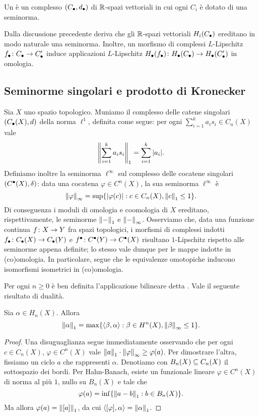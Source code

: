 \begin{definition}
Un  è un complesso $(C_\bullet,d_\bullet)$ di $\mathbb{R}$-spazi vettoriali in cui ogni $C_i$ è dotato di una seminorma.
\end{definition}

Dalla discussione precedente deriva che gli $\mathbb{R}$-spazi vettoriali $H_i(C_\bullet)$ ereditano in modo naturale una seminorma. Inoltre, un morfismo di complessi $L$-Lipschitz $\map{f_\bul}{C_\bul}{C'_\bul}$ induce applicazioni $L$-Lipschitz $\map{H_\bul(f_\bul)}{H_\bul(C_\bul)}{H_\bul(C'_\bul)}$ in omologia.

\subsection{Seminorme singolari e prodotto di Kronecker}

Sia $X$ uno spazio topologico. Muniamo il complesso delle catene singolari $(C_\bullet(X),d)$ della norma $\ell^1$, definita come segue: per ogni $\sum_{i=1}^ka_is_i\in C_n(X)$ vale
\[
\left\lVert \sum_{i=1}^ka_is_i\right\rVert_1=\sum_{i=1}^k|a_i|.
\]
Definiamo inoltre la seminorma $\ell^\infty$ sul complesso delle cocatene singolari $(C^\bullet(X),\delta)$: data una cocatena $\varphi\in C^n(X)$, la sua seminorma $\ell^\infty$ è
\[
\left\lVert \varphi\right\rVert_\infty=\sup\{|\varphi(c)|:c\in C_n(X),\left\lVert c\right\rVert_1\le 1\}.
\]
Di conseguenza i moduli di omologia e coomologia di $X$ ereditano, rispettivamente, le seminorme $\left\lVert -\right\rVert_1$ e $\left\lVert -\right\rVert_\infty$. Osserviamo che, data una funzione continua $\map{f}{X}{Y}$ fra spazi topologici, i morfismi di complessi indotti $\map{f_\bul}{C_\bul(X)}{C_\bul(Y)}$ e $\map{f^\bul}{C^\bul(Y)}{C^\bul(X)}$ risultano $1$-Lipschitz rispetto alle seminorme appena definite; lo stesso vale dunque per le mappe indotte in (co)omologia. In particolare, segue che le equivalenze omotopiche inducono isomorfismi isometrici in (co)omologia.

Per ogni $n\ge 0$ è ben definita l'applicazione bilineare
detta . Vale il seguente risultato di dualità.

\begin{proposition}
Sia $\alpha\in H_n(X)$. Allora
\[
\left\lVert \alpha\right\rVert_1=\max\{\langle\beta,\alpha\rangle:\beta\in H^n(X),\left\lVert \beta\right\rVert_\infty\le 1\}.
\]
\end{proposition}
\begin{proof}
Una disuguaglianza segue immediatamente osservando che per ogni $c\in C_n(X)$, $\varphi\in C^n(X)$ vale $\left\lVert a\right\rVert_1\cdot\left\lVert \varphi\right\rVert_\infty\ge\varphi(a)$. Per dimostrare l'altra, fissiamo un ciclo $a$ che rappresenti $\alpha$. Denotiamo con $B_n(X)\subseteq C_n(X)$ il sottospazio dei bordi. Per Hahn-Banach, esiste un funzionale lineare $\varphi\in C^n(X)$ di norma al più $1$, nullo su $B_n(X)$ e tale che
\[
\varphi(a)=\inf\{\left\lVert a-b\right\rVert_1:b\in B_n(X)\}.
\]
Ma allora $\varphi(a)=\left\lVert [a]\right\rVert_1$, da cui $\langle[\varphi],\alpha\rangle=\left\lVert \alpha\right\rVert_1$.
\end{proof}

